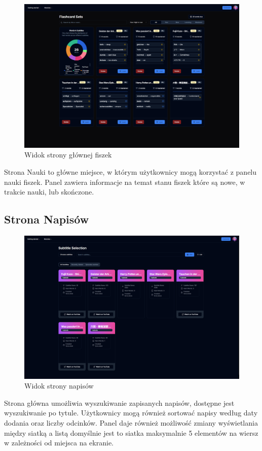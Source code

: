 \begin{figure}[H]
    \centering
    \includegraphics[width=1\textwidth]{IMAGE/FlashCards.png}
    \caption{Widok strony głównej fiszek}
    \label{fig:Strona głowna fiszek}
\end{figure}
Strona Nauki to główne miejsce, w którym użytkownicy mogą korzystać z panelu nauki fiszek. Panel zawiera informacje na temat stanu fiszek które są nowe, w trakcie nauki, lub skończone.

\subsection{Strona Napisów}

\begin{figure}[H]
    \centering
    \includegraphics[width=1\textwidth]{IMAGE/Subtitles.png}
    \caption{Widok strony napisów}
    \label{fig:Strona napisów}
\end{figure}
Strona główna umożliwia wyszukiwanie zapisanych napisów, dostępne jest wyszukiwanie po tytule. Użytkownicy mogą również sortować napisy według daty dodania oraz liczby odcinków. Panel daje również możliwość zmiany wyświetlania między siatką a listą domyślnie jest to siatka maksymalnie 5 elementów na wiersz w zależności od miejsca na ekranie.


